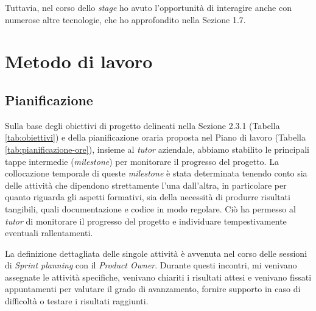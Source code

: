         \noindent Tuttavia, nel corso dello \textit{stage} ho avuto l’opportunità di interagire anche con numerose altre tecnologie, che ho approfondito nella Sezione 1.7.

    \section{Metodo di lavoro}
        \subsection{Pianificazione}
        
        Sulla base degli obiettivi di progetto delineati nella Sezione 2.3.1 (Tabella \ref{tab:obiettivi}) e della pianificazione oraria proposta nel Piano di lavoro (Tabella \ref{tab:pianificazione-ore}), insieme al \textit{tutor} aziendale, abbiamo stabilito le principali tappe intermedie (\textit{milestone}) per monitorare il progresso del progetto. La collocazione temporale di queste \textit{milestone} è stata determinata tenendo conto sia delle attività che dipendono strettamente l'una dall'altra, in particolare per quanto riguarda gli aspetti formativi, sia della necessità di produrre risultati tangibili, quali documentazione e codice in modo regolare. Ciò ha permesso al \textit{tutor} di monitorare il progresso del progetto e individuare tempestivamente eventuali rallentamenti.

        \vspace{0.2 em}
        \noindent La definizione dettagliata delle singole attività è avvenuta nel corso delle sessioni di \textit{Sprint planning} con il \textit{Product Owner}. Durante questi incontri, mi venivano assegnate le attività specifiche, venivano chiariti i risultati attesi e venivano fissati appuntamenti per valutare il grado di avanzamento, fornire supporto in caso di difficoltà o testare i risultati raggiunti. 

        \renewcommand{\arraystretch}{2} %
        \setlength{\tabcolsep}{9pt} %
        
